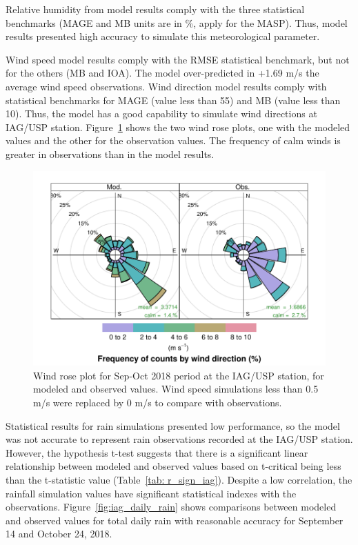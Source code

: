 Relative humidity from model results comply with the three statistical benchmarks (MAGE and MB units are in \%, apply for the MASP).
Thus, model results presented high accuracy to simulate this meteorological parameter.

Wind speed model results comply with the RMSE statistical benchmark, but not for the others (MB and IOA).
The model over-predicted in +1.69 m/s the average wind speed observations.
Wind direction model results comply with statistical benchmarks for MAGE (value less than 55) and MB (value less than 10).
Thus, the model has a good capability to simulate wind directions at IAG/USP station.
Figure~\ref{fig:wrplot_iag} shows the two wind rose plots, one with the modeled values and the other for the observation values. The frequency of calm winds is greater in observations than in the model results.

\begin{figure}[!hbt]
  \centering
  \includegraphics{fig/WRplot_IAG_sep_oct2018}
  \caption{Wind rose plot for Sep-Oct 2018 period at the IAG/USP station, for modeled and observed values. Wind speed simulations less than 0.5 m/s were replaced by 0 m/s to compare with observations.}
  \label{fig:wrplot_iag}
\end{figure}

Statistical results for rain simulations presented low performance, so the model was not accurate to represent rain observations recorded at the IAG/USP station.
However, the hypothesis t-test suggests that there is a significant linear relationship between modeled and observed values based on t-critical being less than the t-statistic value (Table~\ref{tab: r_sign_iag}).
Despite a low correlation, the rainfall simulation values have significant statistical indexes with the observations. 
Figure~\ref{fig:iag_daily_rain} shows comparisons between modeled and observed values for total daily rain with reasonable accuracy for September 14 and October 24, 2018.

